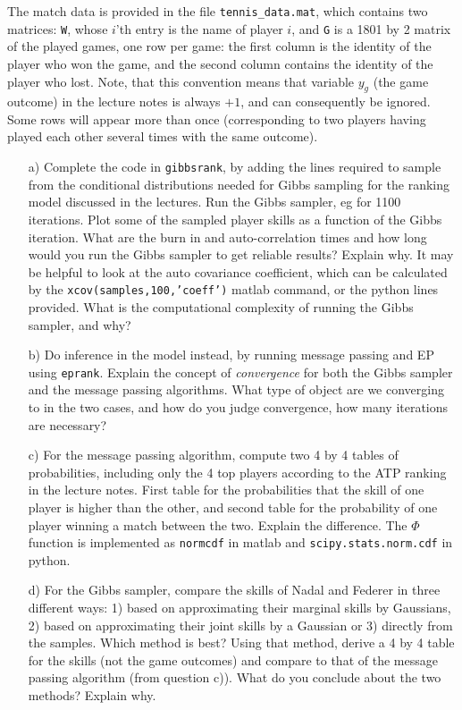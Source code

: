 \documentclass[11pt]{article}
\begin{document}
The match data is provided in the file \texttt{tennis\_data.mat},
which contains two matrices: \texttt{W}, whose $i$'th
entry is the name of player $i$, and \texttt{G} is a 1801 by 2 matrix of
the played games, one row per game: the first column is the identity
of the player who won the game, and the second column contains the
identity of the player who lost. Note, that this convention means that
variable $y_g$ (the game outcome) in the lecture notes is always $+1$,
and can consequently be ignored. Some rows will appear more than once
(corresponding to two players having played each other several times
with the same outcome).
%
\begin{enumerate}

\item[a)] Complete the code in \texttt{gibbsrank}, by adding the lines
  required to sample from the conditional distributions needed for
  Gibbs sampling for the ranking model discussed in the lectures.  Run
  the Gibbs sampler, eg for 1100 iterations. Plot some of the sampled
  player skills as a function of the Gibbs iteration. What are the
  burn in and auto-correlation times and how long would you run the
  Gibbs sampler to get reliable results? Explain why. It may be
  helpful to look at the auto covariance coefficient, which can be
  calculated by the \texttt{xcov(samples,100,'coeff')} matlab command,
  or the python lines provided. What is the computational complexity
  of running the Gibbs sampler, and why?

\item[b)] Do inference in the model instead, by running message
  passing and EP using \texttt{eprank}. Explain the concept of
  \emph{convergence} for both the Gibbs sampler and the message
  passing algorithms. What type of object are we converging to in the
  two cases, and how do you judge convergence, how many iterations are
  necessary?
  
\item[c)] For the message passing algorithm, compute two 4 by 4 tables
  of probabilities, including only the 4 top players according to the
  ATP ranking in the lecture notes. First table for the probabilities
  that the skill of one player is higher than the other, and second
  table for the probability of one player winning a match between the
  two. Explain the difference. The $\Phi$ function is implemented as
  \texttt{normcdf} in matlab and \texttt{scipy.stats.norm.cdf} in python.

\item[d)] For the Gibbs sampler, compare the skills of Nadal and
  Federer in three different ways: 1) based on approximating their
  marginal skills by Gaussians, 2) based on approximating their joint
  skills by a Gaussian or 3) directly from the samples.
  Which method is best? Using that method, derive a 4 by 4 table
  for the skills (not the game outcomes) and compare to that of the
  message passing algorithm (from question c)). What do you conclude
  about the two methods? Explain why.


\end{enumerate}
\end{document}

